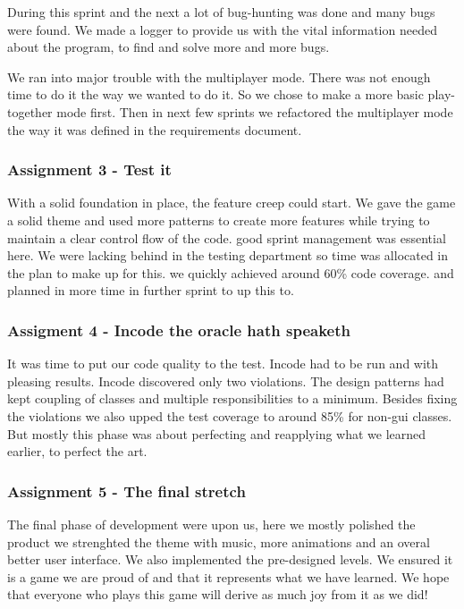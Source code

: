 \documentclass[a4paper]{article}
\begin{document}
During this sprint and the next a lot of bug-hunting was done and many bugs were found. We made a logger to provide us with the vital information needed about the program, to find and solve more and more bugs.

We ran into major trouble with the multiplayer mode. There was not enough time to do it the way we wanted to do it. So we chose to make a more basic play-together mode first. Then in next few sprints we refactored the multiplayer mode the way it was defined in the requirements document.

\subsubsection{Assignment 3 - Test it}
	With a solid foundation in place, the feature creep could start. We gave the game a solid theme and used more patterns to create more features while trying to maintain a clear control flow of the code. good sprint management was essential here. We were lacking behind in the  testing department so time was allocated in the plan to make up for this.
 we quickly achieved around 60\% code coverage. and planned in more time in further sprint to up this to.
 
 \subsubsection{Assigment 4 - Incode the oracle hath speaketh}
 It was time to put our code quality to the test. Incode had to be run and with pleasing results. Incode discovered only two violations. The design patterns had kept coupling of classes and multiple responsibilities to a minimum.
 Besides fixing the violations we also upped the test coverage to around 85\% for non-gui classes. But mostly this phase was about perfecting and reapplying what we learned earlier, to perfect the art.
 
 \subsubsection{Assignment 5 - The final stretch}
 The final phase of development were upon us, here we mostly polished the product we strenghted the theme with music, more animations and an overal better user interface. We also implemented the pre-designed levels. We ensured it is a game we are proud of and that it represents what we have learned. We hope that everyone who plays this game will derive as much joy from it as we did!
\end{document}
